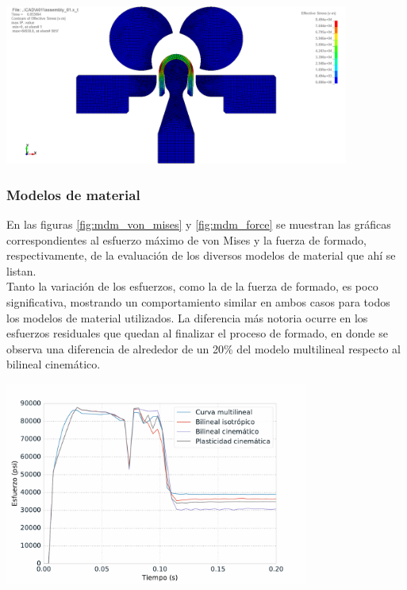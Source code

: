 \begin{center}
\includegraphics[width=0.85\textwidth]{src/ch4/ms_excessive.png}
\label{fig:ms_excessive}
\end{center}

\subsubsection{Modelos de material}

En las figuras  \ref{fig:mdm_von_mises} y \ref{fig:mdm_force} se muestran las gráficas correspondientes 
al esfuerzo máximo de von Mises y la fuerza de formado, respectivamente, de la evaluación de los diversos 
modelos de material que ahí se listan.\\

Tanto la variación de los esfuerzos, como la de la fuerza de formado, es poco significativa, mostrando 
un comportamiento similar en ambos casos para todos los modelos de material utilizados. La 
diferencia más notoria ocurre en los esfuerzos residuales que quedan al finalizar el proceso 
de formado, en donde se observa una diferencia de alrededor de un 20\% del modelo multilineal 
respecto al bilineal cinemático.

\begin{center}
\includegraphics[width=0.75\textwidth]{src/ch4/mdm_von_mises.pdf}
\label{fig:mdm_von_mises}
\end{center}

